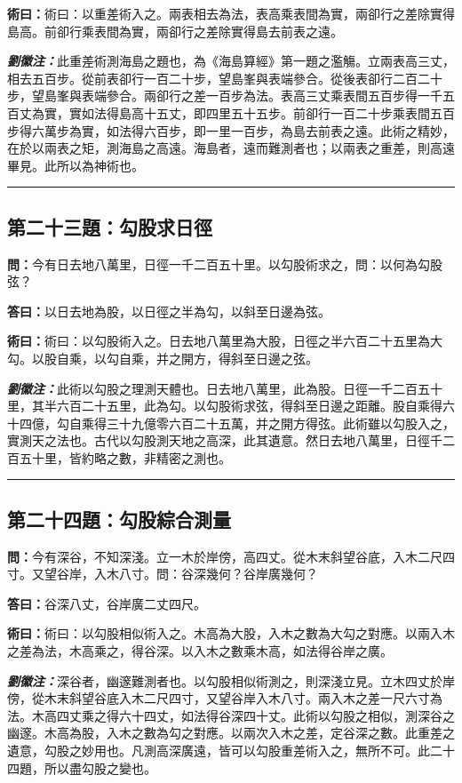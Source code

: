 \documentclass[11pt,a4paper]{article}
\newcommand{\wen}[1]{\textbf{\color{problemcolor}問：}#1\par}
\newcommand{\da}[1]{\textbf{答曰：}#1\par}
\newcommand{\shu}[1]{\textbf{術曰：}#1\par}
\newcommand{\liuhui}[1]{{\color{commentarycolor}\textit{\textbf{劉徽注：}}#1\par}}
\begin{document}
\shu{術曰：以重差術入之。兩表相去為法，表高乘表間為實，兩卻行之差除實得島高。前卻行乘表間為實，兩卻行之差除實得島去前表之遠。}

\liuhui{此重差術測海島之題也，為《海島算經》第一題之濫觴。立兩表高三丈，相去五百步。從前表卻行一百二十步，望島峯與表端參合。從後表卻行二百二十步，望島峯與表端參合。兩卻行之差一百步為法。表高三丈乘表間五百步得一千五百丈為實，實如法得島高十五丈，即四里五十五步。前卻行一百二十步乘表間五百步得六萬步為實，如法得六百步，即一里一百步，為島去前表之遠。此術之精妙，在於以兩表之矩，測海島之高遠。海島者，遠而難測者也；以兩表之重差，則高遠畢見。此所以為神術也。}

\bigskip
\hrule
\bigskip

\subsection{第二十三題：勾股求日徑}

\wen{今有日去地八萬里，日徑一千二百五十里。以勾股術求之，問：以何為勾股弦？}

\da{以日去地為股，以日徑之半為勾，以斜至日邊為弦。}

\shu{術曰：以勾股術入之。日去地八萬里為大股，日徑之半六百二十五里為大勾。以股自乘，以勾自乘，并之開方，得斜至日邊之弦。}

\liuhui{此術以勾股之理測天體也。日去地八萬里，此為股。日徑一千二百五十里，其半六百二十五里，此為勾。以勾股術求弦，得斜至日邊之距離。股自乘得六十四億，勾自乘得三十九億零六百二十五萬，并之開方得弦。此術雖以勾股入之，實測天之法也。古代以勾股測天地之高深，此其遺意。然日去地八萬里，日徑千二百五十里，皆約略之數，非精密之測也。}

\bigskip
\hrule
\bigskip

\subsection{第二十四題：勾股綜合測量}

\wen{今有深谷，不知深淺。立一木於岸傍，高四丈。從木末斜望谷底，入木二尺四寸。又望谷岸，入木八寸。問：谷深幾何？谷岸廣幾何？}

\da{谷深八丈，谷岸廣二丈四尺。}

\shu{術曰：以勾股相似術入之。木高為大股，入木之數為大勾之對應。以兩入木之差為法，木高乘之，得谷深。以入木之數乘木高，如法得谷岸之廣。}

\liuhui{深谷者，幽邃難測者也。以勾股相似術測之，則深淺立見。立木四丈於岸傍，從木末斜望谷底入木二尺四寸，又望谷岸入木八寸。兩入木之差一尺六寸為法。木高四丈乘之得六十四丈，如法得谷深四十丈。此術以勾股之相似，測深谷之幽邃。木高為股，入木之數為勾之對應。以兩次入木之差，定谷深之數。此重差之遺意，勾股之妙用也。凡測高深廣遠，皆可以勾股重差術入之，無所不可。此二十四題，所以盡勾股之變也。}
\end{document}
